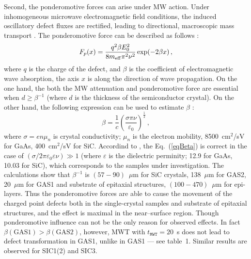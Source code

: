 \documentclass[10pt]{iopart}
\begin{document}
Second, the ponderomotive forces can arise under MW action.
Under inhomogeneous microwave electromagnetic field conditions, the
induced oscillatory defect fluxes are rectified,
leading to directional, macroscopic mass transport \cite{MWT:Rew2001,MWT:PandForce97,MWT:PandForce92}.
The ponderomotive force can be described as follows \cite{MWT:PandForce97,Milenin:SPQEO2020}:
\begin{equation}\label{eqFpan}
  F_p(x)=\frac{q^2\beta E_0^2}{8 m_{\rm eff} \pi^2 \nu^2} \exp(-2\beta x)\,,
\end{equation}
where
$q$ is the charge of the defect,
and $\beta$ is the coefficient of electromagnetic wave absorption,
the axis $x$ is along the direction of wave propagation.
On the one hand, the both the MW attenuation and ponderomotive force are essential
when $d\geq\beta^{-1}$
(where $d$ is the thickness of the semiconductor crystal).
On the other hand, the following expression can be used to estimate $\beta$ \cite{Milenin:SPQEO2020}:
\begin{equation}\label{eqBeta}
  \beta=\frac{1}{c}\left(\frac{\sigma\pi\nu}{\varepsilon_0}\right)^{\frac{1}{2}}\,,
\end{equation}
where
$\sigma=e n \mu_n$ is crystal conductivity;
$\mu_n$  is the electron mobility,
8500~cm$^2$/sV for GaAs, 400~cm$^2$/sV for SiC.
Accordind to \cite{Milenin:SPQEO2020},
the Eq.~(\ref{eqBeta}) is correct in the case of
$(\sigma/2\pi\varepsilon_0\varepsilon\nu)\gg1$
(where
$\varepsilon$ is the dielectric perminity;
12.9 for GaAs, 10.03 for SiC),
which corresponds to the samples under investigation.
The calculations show that
$\beta^{-1}$ is $(57-90)$~$\mu$m for SiC crystals,
138~$\mu$m for GAS2,
20~$\mu$m for GAS1 and substrate of epitaxial structures,
$(100-470)$~$\mu$m for epi-layers.
Thus the ponderomotive forces are able to cause the movement of the
charged point defects both in the single-crystal samples and
substrate of epitaxial structures, and the effect is maximal in the near--surface region.
Though ponderomotive influence can  not be the only reason for observed effects.
In fact $\beta(\mathrm{GAS1})>\beta(\mathrm{GAS2})$,
however, MWT with $t_\mathtt{MWT}=20$~s does not lead to defect transformation
in GAS1, unlike in GAS1 --- see table~1.
Similar results are observed for SIC1(2) and SIC3.
\end{document}
